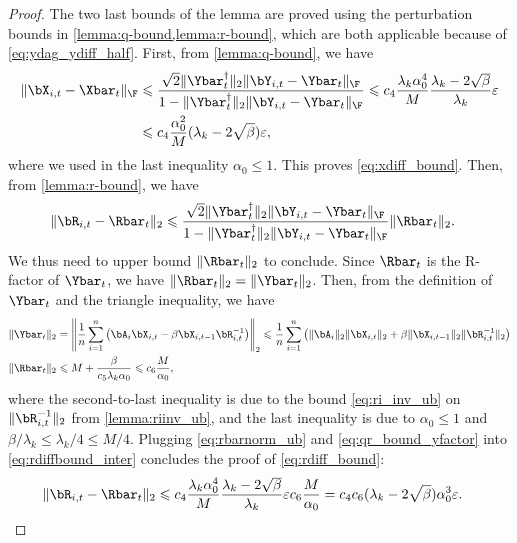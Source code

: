 \documentclass{article}
\theoremstyle{plain}
\theoremstyle{definition}
\theoremstyle{remark}
\begin{document}
\begin{proof}
  The two last bounds of the lemma are proved using the perturbation bounds in \cref{lemma:q-bound,lemma:r-bound}, which are both applicable because of \eqref{eq:ydag_ydiff_half}. First, from \cref{lemma:q-bound}, we have
  \begin{align*}
    \Vert \bX_{i,t} - \Xbar_t \Vert_\F & \leqslant \frac{\sqrt{2}\Vert\Ybar_t^\dagger\Vert_2\Vert\bY_{i,t} - \Ybar_t\Vert_\F}{1 - \Vert\Ybar_t^\dagger\Vert_2\Vert\bY_{i,t} - \Ybar_t\Vert_\F} \leqslant c_4 \frac{\lambda_k \alpha_0^4}{M} \frac{\lambda_k-2\sqrt{\beta}}{\lambda_k}\varepsilon \\
    & \leqslant c_4 \frac{\alpha_0^2}{M} (\lambda_k-2\sqrt{\beta})\varepsilon,
  \end{align*} 
  where we used in the last inequality $\alpha_0 \leqslant 1$. This proves \eqref{eq:xdiff_bound}. Then, from \cref{lemma:r-bound}, we have
  \begin{align}\label{eq:rdiffbound_inter}
    \Vert \bR_{i,t} - \Rbar_t \Vert_2 & \leqslant \frac{\sqrt{2}\Vert\Ybar_t^\dagger\Vert_2\Vert\bY_{i,t} - \Ybar_t\Vert_\F}{1 - \Vert\Ybar_t^\dagger\Vert_2\Vert\bY_{i,t} - \Ybar_t\Vert_\F}\Vert\Rbar_t\Vert_2.
  \end{align}
  We thus need to upper bound $\Vert \Rbar_t \Vert_2$ to conclude. Since $\Rbar_t$ is the R-factor of $\Ybar_t$, we have $\Vert \Rbar_t \Vert_2 = \Vert \Ybar_t \Vert_2$. Then, from the definition of $\Ybar_t$ and the triangle inequality, we have
  \begin{align}
    \Vert \Ybar_t \Vert_2 & = \left\Vert \frac{1}{n}\sum_{i=1}^n \left( \bA_i \bX_{i,t} - \beta \bX_{i,t-1} \bR_{i,t}^{-1} \right) \right\Vert_2 \leqslant \frac{1}{n}\sum_{i=1}^n \left( \Vert \bA_i \Vert_2 \Vert \bX_{i,t} \Vert_2 + \beta \Vert \bX_{i,t-1} \Vert_2 \Vert \bR_{i,t}^{-1} \Vert_2 \right)\nonumber \\
    \Vert \Rbar_t \Vert_2& \leqslant M + \frac{\beta }{c_5 \lambda_k \alpha_0} \leqslant c_6 \frac{M}{\alpha_0}, \label{eq:rbarnorm_ub}
  \end{align}
  where the second-to-last inequality is due to the bound \eqref{eq:ri_inv_ub} on $\Vert\bR_{i,t}^{-1}\Vert_2$ from \cref{lemma:riinv_ub}, and the last inequality is due to $\alpha_0 \leqslant 1$ and $\beta/\lambda_k \leqslant \lambda_k/4 \leqslant M/4$. Plugging \eqref{eq:rbarnorm_ub} and \eqref{eq:qr_bound_yfactor} into \eqref{eq:rdiffbound_inter} concludes the proof of \eqref{eq:rdiff_bound}:
  \begin{align*}
    \Vert \bR_{i,t} - \Rbar_t \Vert_2 & \leqslant c_4 \frac{\lambda_k \alpha_0^4}{M} \frac{\lambda_k-2\sqrt{\beta}}{\lambda_k}\varepsilon c_6 \frac{M}{\alpha_0} = c_4c_6 (\lambda_k-2\sqrt{\beta})\alpha_0^3 \varepsilon.
  \end{align*}
\end{proof}
\end{document}
